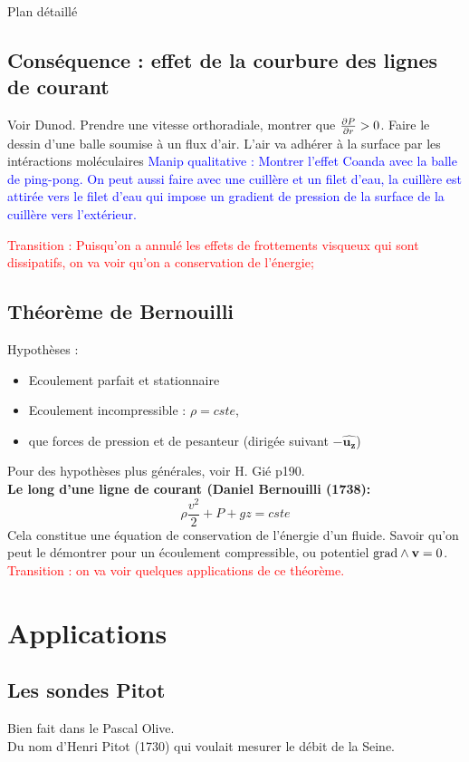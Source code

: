 \begin{reportBlock}{Plan détaillé}
\subsection{Conséquence : effet de la courbure des lignes de courant}
Voir Dunod. Prendre une vitesse orthoradiale, montrer que $\frac{\partial P}{\partial r}>0$. Faire le dessin d'une balle soumise à un flux d'air. L'air va adhérer à la surface par les intéractions moléculaires \textcolor{blue}{Manip qualitative : Montrer l'effet Coanda avec la balle de ping-pong. On peut aussi faire avec une cuillère et un filet d'eau, la cuillère est attirée vers le filet d'eau qui impose un gradient de pression de la surface de la cuillère vers l'extérieur.}

\textcolor{red}{Transition : Puisqu'on a annulé les effets de frottements visqueux qui sont dissipatifs, on va voir qu'on a conservation de l'énergie;}

\subsection{Théorème de Bernouilli}
Hypothèses :
\begin{itemize}
    \item Ecoulement parfait et stationnaire
    \item Ecoulement incompressible : $\rho=cste$,
    \item que forces de pression et de pesanteur (dirigée suivant $-\mathbf{\hat{u_z}}$)
\end{itemize}
Pour des hypothèses plus générales, voir H. Gié p190.\\

\textbf{Le long d'une ligne de courant (Daniel Bernouilli (1738):}
\begin{equation}
    \rho\frac{v^2}{2}+P+gz = cste
\end{equation}
Cela constitue une équation de conservation de l'énergie d'un fluide. Savoir qu'on peut le démontrer pour un écoulement compressible, ou potentiel $\mathbf{\mathrm{grad}}\wedge\mathbf{v}=0$.\\

\textcolor{red}{Transition : on va voir quelques applications de ce théorème.}

\section{Applications}

\subsection{Les sondes Pitot}
Bien fait dans le Pascal Olive.\\
Du nom d'Henri Pitot (1730) qui voulait mesurer le débit de la Seine.\\


\end{reportBlock}

